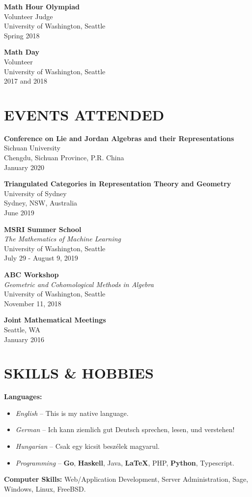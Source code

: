 \documentclass[margin]{res} %
\begin{document}
\begin{resume}
{\bf Math Hour Olympiad}\\
Volunteer Judge \\
University of Washington, Seattle\\
Spring 2018

{\bf Math Day}\\
Volunteer\\
University of Washington, Seattle\\
2017 and 2018

\section{\bf EVENTS ATTENDED}

{\bf Conference on Lie and Jordan Algebras and their Representations}\\
Sichuan University\\
Chengdu, Sichuan Province, P.R. China\\
January 2020

{\bf Triangulated Categories in Representation Theory and Geometry}\\
University of Sydney\\
Sydney, NSW, Australia\\
June 2019

{\bf MSRI Summer School}\\
{\sl The Mathematics of Machine Learning}\\
University of Washington, Seattle\\
July 29 - August 9, 2019

{\bf ABC Workshop}\\
{\sl Geometric and Cohomological Methods in Algebra}\\
University of Washington, Seattle\\
November 11, 2018

{\bf Joint Mathematical Meetings}\\
Seattle, WA\\
January 2016


\section{SKILLS \& HOBBIES} 

{\bf Languages:}
\begin{itemize} \itemsep -2pt
	\item {\sl English} -- This is my native language.
	\item {\sl German} -- Ich kann ziemlich gut Deutsch sprechen, lesen, und verstehen!
	\item {\sl Hungarian} -- Csak egy kicsit besz\'elek magyarul.
	\item {\sl Programming} -- {\bf Go}, {\bf Haskell}, Java, {\bf \LaTeX}, PHP, {\bf Python}, Typescript.
\end{itemize}
{\bf Computer Skills:} Web/Application Development, Server Administration, Sage, Windows, Linux, FreeBSD.


\end{resume}
\end{document}
